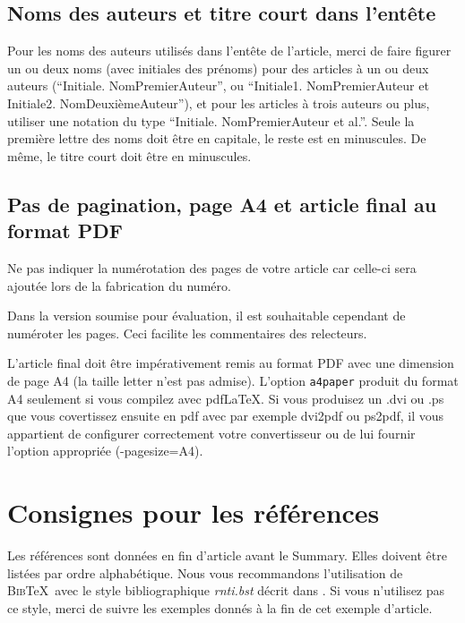 \documentclass[a4paper,french]{rnti}
\begin{document}
\subsection{Noms des auteurs et titre court dans l'entête}

Pour les noms des auteurs utilisés dans l'entête de l'article, merci
de faire figurer un ou deux noms (avec initiales des prénoms) pour
des articles à un ou deux auteurs (``Initiale. NomPremierAuteur'',
ou ``Initiale1. NomPremierAuteur et Initiale2. NomDeuxièmeAuteur''),
et pour les articles à trois auteurs ou plus, utiliser une notation
du type ``Initiale. NomPremierAuteur et al.''. Seule la première
lettre des noms doit être en capitale, le reste est en minuscules.
De même, le titre court doit être en minuscules.



\subsection{Pas de pagination, page A4 et article final au format PDF}

Ne pas indiquer la numérotation des pages de votre article car
celle-ci sera ajoutée lors de la fabrication du numéro.

Dans la version soumise pour évaluation, il est souhaitable
cependant de numéroter les pages. Ceci facilite les commentaires des
relecteurs.

L'article final doit être impérativement remis au format PDF avec
une dimension de page A4 (la taille letter n'est pas admise).
L'option \texttt{a4paper} produit du format A4 seulement si vous
compilez avec pdf\LaTeX{}. Si vous produisez un .dvi ou .ps que vous
covertissez ensuite en pdf avec par exemple dvi2pdf ou ps2pdf, il
vous appartient de configurer correctement votre convertisseur ou de
lui fournir l'option appropriée (-pagesize=A4).


\section{Consignes pour les références}

Les références sont données en fin d'article avant le
\guilo{}Summary\guilf{}. Elles doivent être listées par ordre
alphabétique.  Nous vous recommandons l'utilisation de
\textsc{Bib}\TeX\ avec le style bibliographique \textit{rnti.bst}
décrit dans \citet{ritschard:2005rnti}. Si vous n'utilisez pas ce
style, merci de suivre les exemples donnés à la fin de cet exemple
d'article.
\end{document}
